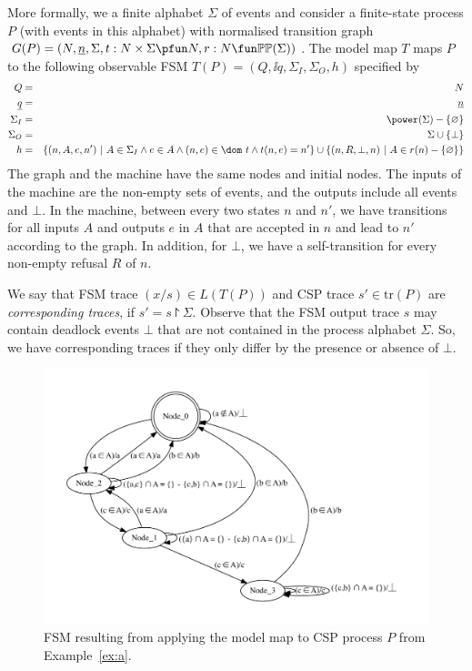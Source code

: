 More formally, we a finite alphabet $\Sigma$ of events and consider a
finite-state process $P$ (with events in this alphabet) with normalised
transition graph $G(P)=( N, \ii n, \Sigma, t : N\times\Sigma \pfun N, r : N
\fun \mathbb{P}\mathbb{P}(\Sigma))$. The model map $T$ maps $P$ to the
following observable FSM $T(P) = (Q,\ii q, \Sigma_I,\Sigma_O,h)$ specified by
%
\begin{eqnarray*}
  Q & = & N
  \\
  \ii q & = & \ii n
  \\
  \Sigma_I & = & \power(\Sigma) - \{ \varnothing \}
  \\
  \Sigma_O & = & \Sigma \cup \{ \bot\}
  \\
  h & = & \{ (n,A,e,n')~|~A\in \Sigma_I \wedge e\in A \wedge (n,e)\in \dom~t\wedge t(n,e) = n' \} \cup
  \{ (n,R,\bot,n)~|~A\in r(n) -\{\varnothing\} \}
\end{eqnarray*}
%
The graph and the machine have the same nodes and initial nodes. The inputs
of the machine are the non-empty sets of events, and the outputs include all
events and $\bot$. In the machine, between every two states $n$ and $n'$, we
have transitions for all inputs $A$ and outputs $e$ in $A$ that are accepted
in $n$ and lead to $n'$ according to the graph. In addition, for $\bot$, we
have a self-transition for every non-empty refusal $R$ of $n$.

We say that FSM trace $(x/s) \in L(T(P))$ and CSP trace $s'\in\text{tr}(P)$
are \emph{corresponding traces}, if $s' = s\project \Sigma$. Observe that the
FSM output trace $s$ may contain deadlock events $\bot$ that are not
contained in the  process alphabet $\Sigma$. So, we have corresponding traces
if they only differ by the presence or absence of $\bot$.

 \begin{figure}
 \begin{center}
\includegraphics[width=\textwidth]{fsm0.pdf}
\end{center}
\caption{FSM resulting from applying the model map to CSP process $P$ from Example~\ref{ex:a}.}
 \label{fig:fsm0}
 \end{figure}


